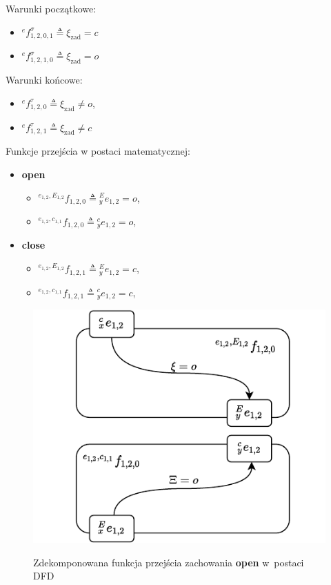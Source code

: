 Warunki początkowe:
\begin{itemize}
    \item ${}^{e}f^{\sigma}_{1,2,0,1} \triangleq \xi_{\mathrm{zad}} = c$
    \item ${}^{e}f^{\sigma}_{1,2,1,0} \triangleq \xi_{\mathrm{zad}} = o$
\end{itemize}

Warunki końcowe:
\begin{itemize}
    \item ${}^{e}f^{\tau}_{1,2,0} \triangleq \xi_{\mathrm{zad}} \neq o$,
    \item ${}^{e}f^{\tau}_{1,2,1} \triangleq \xi_{\mathrm{zad}} \neq c$
\end{itemize}

Funkcje przejścia w postaci matematycznej:
\begin{itemize}
    \item \textbf{open} \begin{itemize}
        \item ${}^{e_{1,2}, E_{1,2}}f_{1,2,0} \triangleq {}^{E}_{y}e_{1,2} = o$,
        \item ${}^{e_{1,2}, c_{1,1}}f_{1,2,0} \triangleq {}^{c}_{y}e_{1,2} = o$,
    \end{itemize} 
    \item \textbf{close} \begin{itemize}
        \item ${}^{e_{1,2}, E_{1,2}}f_{1,2,1} \triangleq {}^{E}_{y}e_{1,2} = c$,
        \item ${}^{e_{1,2}, c_{1,1}}f_{1,2,1} \triangleq {}^{c}_{y}e_{1,2} = c$,
    \end{itemize}
\end{itemize}

\begin{figure}
    \centering
    \includegraphics[width=\columnwidth]{figures/ISR-ve-gripper-fp-open.pdf}
    \label{fig:ve-gripper-fp-open}
    \caption{Zdekomponowana funkcja przejścia zachowania \textbf{open} w~postaci DFD}
\end{figure}

